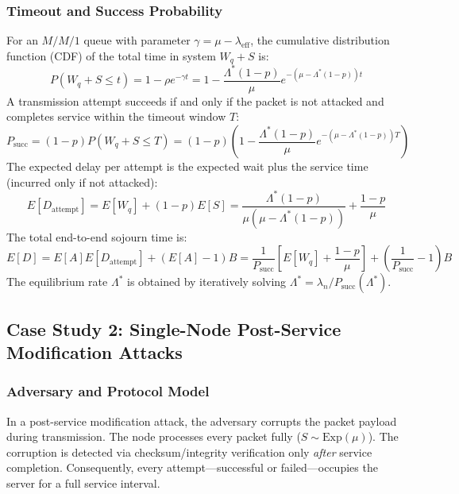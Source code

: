\documentclass[12pt,onecolumn]{article}
\begin{document}
\subsubsection{Timeout and Success Probability}
For an $M/M/1$ queue with parameter $\gamma = \mu - \lambda_{\text{eff}}$, the cumulative distribution function (CDF) of the total time in system $W_q + S$ is:
\begin{equation}
P(W_q + S \le t) = 1 - \rho e^{-\gamma t} = 1 - \frac{\Lambda^*(1-p)}{\mu} e^{-(\mu - \Lambda^*(1-p))t}
\end{equation}
A transmission attempt succeeds if and only if the packet is not attacked and completes service within the timeout window $T$:
\begin{equation}
P_{\text{succ}} = (1 - p) P(W_q + S \le T) = (1 - p)\left(1 - \frac{\Lambda^*(1-p)}{\mu} e^{-(\mu - \Lambda^*(1-p))T}\right)
\end{equation}
The expected delay per attempt is the expected wait plus the service time (incurred only if not attacked):
\begin{equation}
E[D_{\text{attempt}}] = E[W_q] + (1 - p) E[S] = \frac{\Lambda^*(1-p)}{\mu(\mu - \Lambda^*(1-p))} + \frac{1-p}{\mu}
\end{equation}
The total end-to-end sojourn time is:
\begin{equation}
E[D] = E[A] E[D_{\text{attempt}}] + (E[A] - 1) B = \frac{1}{P_{\text{succ}}} \left[E[W_q] + \frac{1-p}{\mu}\right] + \left(\frac{1}{P_{\text{succ}}} - 1\right) B
\end{equation}
The equilibrium rate $\Lambda^*$ is obtained by iteratively solving $\Lambda^* = \lambda_n / P_{\text{succ}}(\Lambda^*)$.

\subsection{Case Study 2: Single-Node Post-Service Modification Attacks}
\subsubsection{Adversary and Protocol Model}
In a post-service modification attack, the adversary corrupts the packet payload during transmission. The node processes every packet fully ($S \sim \text{Exp}(\mu)$). The corruption is detected via checksum/integrity verification only \textit{after} service completion. Consequently, every attempt—successful or failed—occupies the server for a full service interval.
\end{document}
